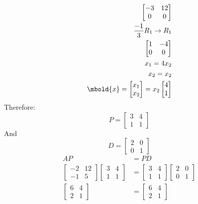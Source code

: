 \documentclass[12pt letter]{report}
\begin{document}
{\begin{align*}
    \begin{bmatrix}
      -3 & 12 \\
      0  & 0  \\
    \end{bmatrix}
    \\
    \frac{-1}{3}R_1 \to R_1                                                                        \\
    \begin{bmatrix}
      1 & -4 \\
      0 & 0  \\
    \end{bmatrix}
    \\
    x_1 = 4x_2                                                                                     \\
    x_2 = x_2                                                                                      \\
    \mbold{x} = \begin{bmatrix} x_1 \\ x_2 \end{bmatrix} = x_2\begin{bmatrix} 4 \\ 1 \end{bmatrix} \\
  \end{align*}
  Therefore:
  \[
    P = \begin{bmatrix} 3 & 4 \\ 1 & 1 \end{bmatrix}
  \]
  And
  \[
    D = \begin{bmatrix} 2 & 0 \\ 0 & 1 \end{bmatrix}
  \]
  \begin{align*}
    AP                                                         & = PD                                          \\
    \begin{bmatrix}
      -2 & 12 \\
      -1 & 5
    \end{bmatrix} \begin{bmatrix} 3 & 4 \\ 1 & 1 \end{bmatrix} & =
    \begin{bmatrix} 3 & 4 \\ 1 & 1 \end{bmatrix} \begin{bmatrix} 2 & 0 \\ 0 & 1 \end{bmatrix}                  \\
    \begin{bmatrix} 6 & 4 \\ 2 & 1 \end{bmatrix}               & =\begin{bmatrix} 6 & 4 \\ 2 & 1 \end{bmatrix}
  \end{align*}
}
\end{document}
